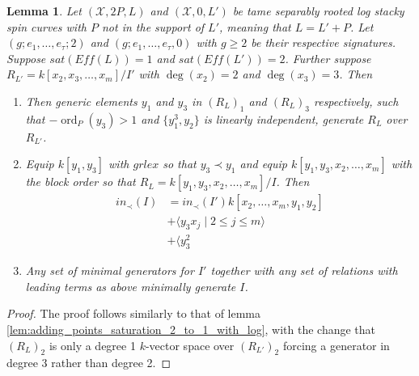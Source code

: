\documentclass{amsart}
\theoremstyle{plain}
\newtheorem{lem}[thm]{Lemma}
\theoremstyle{definition}
\theoremstyle{remark}
\numberwithin{equation}{section}
\newcommand \sx{\mathscr X}
\DeclareMathOperator{\ord}{ord}
\newcommand \halfcan{L}
\begin{document}
\begin{lem}
\label{lem:adding_points_saturation_2_to_1_no_log}
Let $(\sx, 2P, \halfcan)$ and $(\sx, 0, L')$ be tame separably rooted log stacky spin curves 
with $P$ not in the support of $\halfcan'$, meaning that $L=L'+P$.  Let $(g; e_1, \ldots, e_
\tau; 2)$ and $(g; e_1, \ldots, e_\tau, 0)$ with $g\ge 2$ be their respective signatures.  
Suppose $sat(Eff(\halfcan))=1$ and $sat(Eff(\halfcan'))=2$.  Further suppose 
$R_{\halfcan'} = k[x_2, x_3, \ldots, x_m]/I'$ with $\deg(x_2) = 2$ and $\deg(x_3) = 3$.  
Then
\begin{enumerate}
\item[(a)] Then generic elements $y_1$ and $y_3$ in $(R_{\halfcan})_1$ and $
(R_{\halfcan})_3$ respectively, such that $-\ord_P(y_3)>1$ and $\{y_1^3, y_2\}$ is linearly 
independent, generate $R_\halfcan$ over $R_{\halfcan'}$.
\item[(b)] Equip $k[y_1,y_3]$ with $grlex$ so that $y_3 \prec y_1$ and equip $k[y_1, y_3, 
x_2, \ldots, x_m]$ with the block order so that $R_\halfcan=k[y_1, y_3, x_2, \ldots, x_m]/I$.  
Then
\begin{align*}
			in_\prec(I) &= in_\prec(I')k[x_2, \ldots, x_m, y_1, y_2] \\
			&+\langle y_3 x_j \mid 2 \leq j \leq m \rangle \\
			&+\langle y_3^2
		\end{align*}
\item[(c)] Any set of minimal generators for $I'$ together with any set of relations with 
leading terms as above minimally generate $I$.
\end{enumerate}
\end{lem}
\begin{proof}
The proof follows similarly to that of lemma 
\ref{lem:adding_points_saturation_2_to_1_with_log}, with the change that $(R_
\halfcan)_2$ is only a degree 1 $k$-vector space over $(R_{\halfcan'})_2$ forcing a 
generator in degree 3 rather than degree 2.  
\end{proof}
\end{document}
